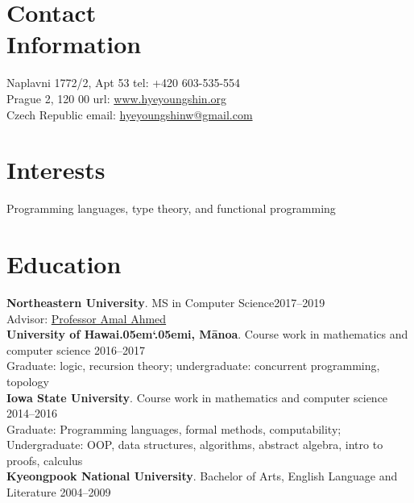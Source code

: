 \documentclass[margin,line]{resume}
\begin{document}
\newcommand{\Hawaii}{Hawai\kern.05em`\kern.05em\relax i}
\newcommand{\Manoa}{M\=anoa}

\begin{resume}

    \section{\mysidestyle Contact\\Information}
     Naplavni 1772/2, Apt 53          \hfill tel: +420 603-535-554\\
     Prague 2, 120 00                \hfill url: \href{https://hyeyoungshin.github.io/}{www.hyeyoungshin.org}\\
     Czech Republic  \hfill             \hfill email:  \href{mailto:hyeyoungshinw@gmail.com}{hyeyoungshinw@gmail.com}

    \section{\mysidestyle Interests}

    Programming languages, type theory, and functional programming
    
    \section{\mysidestyle Education}

    \newcommand\mysmallskip{4pt}
    \newcommand\mymedskip{6pt}
    \newcommand\mybigskip{8pt}

    \textbf{Northeastern University}. MS in Computer Science\hfill 2017--2019\\
    Advisor: \href{http://www.ccs.neu.edu/home/amal/}{Professor Amal Ahmed}\\[\mymedskip]
    \textbf{University of \Hawaii, \Manoa}. Course work in mathematics
      and computer science \hfill 2016--2017\\  %
    {\small Graduate: logic, recursion theory; undergraduate: concurrent programming, topology} \\[\mymedskip]
    \textbf{Iowa State University}. Course work in mathematics and computer science \hfill 2014--2016\\
    {\small Graduate: Programming languages, formal methods,  computability;\\
    Undergraduate: OOP, data structures, algorithms, abstract algebra, intro to proofs, calculus} \\[\mymedskip]
    \textbf{Kyeongpook National University}. Bachelor of Arts, English Language and Literature \hfill 2004--2009  %
    


\end{resume}
\end{document}
